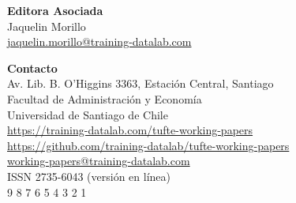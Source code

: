 \documentclass[a4paper]{tufte-book} %
\begin{document}
\begin{fullwidth}
{\noindent \bfseries Editora Asociada}\\
{\noindent Jaquelin Morillo}\\
{\noindent {\Large \Letter} \href{mailto:jaquelin.morillo@training-datalab.com}{jaquelin.morillo@training-datalab.com}}

{\noindent \bfseries Contacto}\\
{\noindent Av. Lib. B. O'Higgins 3363, Estación Central, Santiago}\\
{\noindent Facultad de Administración y Economía}\\
{\noindent Universidad de Santiago de Chile}\\
{\noindent {\Large \faHome} \href{https://training-datalab.com/tufte-working-papers/}{https://training-datalab.com/tufte-working-papers}}\\
{\noindent {\Large \faGithub} \href{https://github.com/training-datalab/tufte-working-papers}{https://github.com/training-datalab/tufte-working-papers}}\\
{\noindent {\Large \Letter} \href{mailto:working-papers@training-datalab.com}{working-papers@training-datalab.com}}\\

{\noindent ISSN 2735-6043 {\footnotesize (versi\'on en l\'inea)}}\\

{\footnotesize {} \hspace{1mm} 9 \hspace{1mm} \hspace{1mm} 8 \hspace{1mm} 7 \hspace{1mm} 6 \hspace{1mm} 5 \hspace{1mm} 4 \hspace{1mm} 3 \hspace{1mm} 2 \hspace{1mm} 1}
\end{fullwidth}
\end{document}
